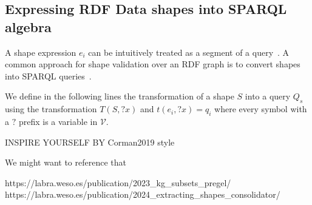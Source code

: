 \subsection{Expressing RDF Data shapes into SPARQL algebra}\label{sec:shape2SPARQL}

A shape expression $e_i$ can be intuitively treated as a segment of a query~\cite{delva2023}.
A common approach for shape validation over an RDF graph is to convert shapes into SPARQL queries~\cite{labragayo2017validatingdescribinglinkeddata, Corman2019,Prestamo2023, spapeExpressionConvert}.~

\iffalse
For our query-shape containment problem we are looking into transforming our shapes $S$ into queries $Q_s =  q_i \bowtie q_{i+1} ... \bowtie q_n$ by transforming each $e_i$ of $s$ in a $q_i$.
We are looking into creating a query $Q_s$ with the following property
\begin{equation}\label{eq:shapeSPARQL}
   G \models S \iff [\![ Q_s ]\!]^{G} =  G
\end{equation}
For every $G$.

Our definition is aimed at close shapes because we are not looking into validating data but into containment since an open shape can validate 
For any $G$ that contains at least the constraint specified by $S$, we simplify the fact that if we neglect negative statements, any query can be contained in such a shape.
The intuition behind equation~\ref{eq:shapeSPARQL} is that we are looking to produce a query that simulates the behavior of a shape.
It is natural from the definition of shape languages. It has been shown in the literature that shape constraint can be transformed into a combination of triple patterns, filter expressions, and other SPARQL fragments.
Thus, if we can establish a mapping between the constraints of $S$ in terms of query fragments, a query targeting $G$ should return $G$ if every triple of the 
$G$ respects the constraint of the shape.
\fi
We define in the following lines the transformation of a shape $S$ into a query $Q_s$ using the transformation $T(S,?x)$ and $t(e_i, ?x) = q_i$ where every 
symbol with a $?$ prefix is a variable in $\mathcal{V}$.

\iffalse
INSPIRE YOURSELF BY Corman2019 style

We might want to reference that

https://labra.weso.es/publication/2023_kg_subsets_pregel/
https://labra.weso.es/publication/2024_extracting_shapes_consolidator/

